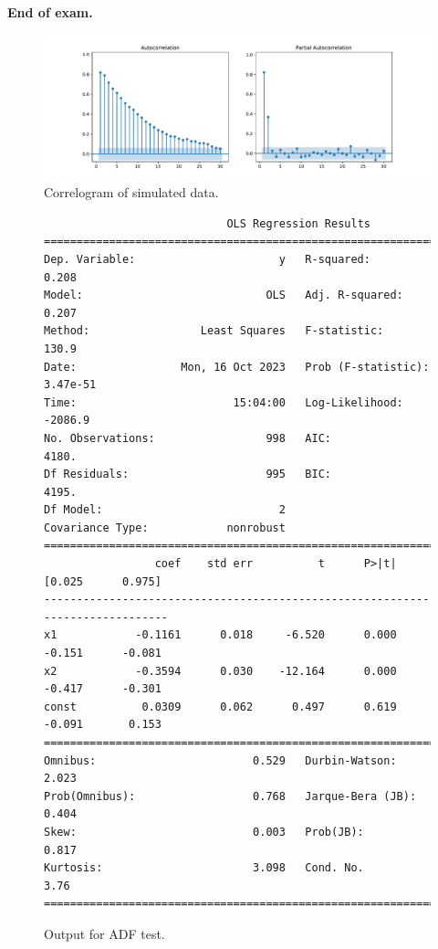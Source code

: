 \documentclass[12pt, a4paper]{article}
\begin{document}
\mbox{}
\vfill
\begin{center}
\huge\bfseries End of exam.
\end{center}
\vfill
\newpage
\begin{figure}[H]
\begin{center}
\includegraphics[width=\textwidth]{correlogram_ar2}
\end{center}
\caption{Correlogram of simulated data.}\label{fig:corr}
\end{figure}
\begin{figure}[H]
\footnotesize
\begin{verbatim}
                            OLS Regression Results
==============================================================================
Dep. Variable:                      y   R-squared:                       0.208
Model:                            OLS   Adj. R-squared:                  0.207
Method:                 Least Squares   F-statistic:                     130.9
Date:                Mon, 16 Oct 2023   Prob (F-statistic):           3.47e-51
Time:                        15:04:00   Log-Likelihood:                -2086.9
No. Observations:                 998   AIC:                             4180.
Df Residuals:                     995   BIC:                             4195.
Df Model:                           2
Covariance Type:            nonrobust
==============================================================================
                 coef    std err          t      P>|t|      [0.025      0.975]
------------------------------------------------------------------------------
x1            -0.1161      0.018     -6.520      0.000      -0.151      -0.081
x2            -0.3594      0.030    -12.164      0.000      -0.417      -0.301
const          0.0309      0.062      0.497      0.619      -0.091       0.153
==============================================================================
Omnibus:                        0.529   Durbin-Watson:                   2.023
Prob(Omnibus):                  0.768   Jarque-Bera (JB):                0.404
Skew:                           0.003   Prob(JB):                        0.817
Kurtosis:                       3.098   Cond. No.                         3.76
==============================================================================

\end{verbatim}
\caption{Output for ADF test.}\label{fig:adf}
\end{figure}
\end{document}
